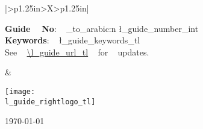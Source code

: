 {\begin{tabularx}{\textwidth}{|>{\centering\arraybackslash}p{1.25in}>{\centering\arraybackslash}X>{\raggedleft\arraybackslash}p{1.25in}|}
\begin{minipage}[c][1\totalheight][b]{3.5in}
      \smallskip
      \par     
      \begin{flushleft}
        {\small{}\textbf{Guide ~ No}: ~ \int_to_arabic:n { \l_guide_number_int  }}\\
        \textbf{Keywords}: ~ \l_guide_keywords_tl \\
        See ~ \url{\l_guide_url_tl} ~ for ~ updates.
        \par
      \end{flushleft}
      \smallskip
    \end{minipage} & 
    \begin{minipage}[c]{\linewidth}
      \par
      \begin{center}
        \texttt{[image: \\l\_guide\_rightlogo\_tl]}
      \end{center}
      \par
    \end{minipage}
    \par
    \begin{minipage}[c]{\linewidth}
      \smallskip
      \begin{center}
        \crmda\today
        \par
      \end{center}
        \smallskip
    \end{minipage}
    \tabularnewline
    \hline 
  \end{tabularx}
}
\ExplSyntaxOff


